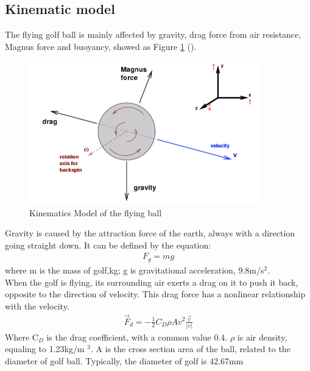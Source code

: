 \subsection{Kinematic model}
The flying golf ball is mainly affected by gravity, drag force from air resistance, Magnus force and buoyancy, showed as Figure \ref{fig:model} (\cite{KinematicModel}). 
\begin{figure}[H]
    \centering
    \includegraphics[width=10cm]{figure/force.png}
    \caption{Kinematics Model of the flying ball}
    \label{fig:model}
\end{figure}
Gravity is caused by the attraction force of the earth, always with a direction going straight down. It can be defined by the equation:
\begin{align}
F_{g}=m g
\end{align}
where m is the mass of golf,kg; g is gravitational acceleration, 9.8m/s$^2$.\\

When the golf is flying, its surrounding air exerts a drag on it to push it back, opposite to the direction of velocity. This drag force has a nonlinear relationship with the velocity.
\begin{align}
\vec{F}_{d}=-\frac{1}{2} C_{D} \rho A v^{2} \frac{\vec{v}}{|v|}
\end{align}
Where C$_D$ is the drag coefficient, with a common value 0.4. $\rho$ is air density, equaling to 1.23kg/m $^3$. A is the cross section area of the ball, related to the diameter of golf ball. Typically, the diameter of golf is 42.67mm\\

